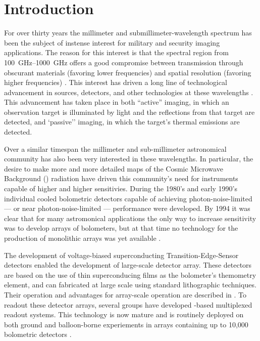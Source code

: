 \chapter{Introduction} \label{c:intro}



For over thirty years the millimeter and submillimeter-wavelength spectrum has been the subject of instense interest for military and security imaging applications.
The reason for this interest is that the spectral region from \SIrange{100}{1000}{\GHz} offers a good compromise between transmission through obscurant materials (favoring lower frequencies) and spatial resolution (favoring higher frequencies) \cite{kruse_why_1981}.
This interest has driven a long line of technological advancement in sources, detectors, and other technologies at these wavelengths \cite{popovic_thz_2011}.
This advancement has taken place in both ``active'' imaging, in which an observation target is illuminated by light and the reflections from that target are detected, and `passive'' imaging, in which the target's thermal emissions are detected.

Over a similar timespan the millimeter and sub-millimeter astronomical community has also been very interested in these wavelengths.
In particular, the desire to make more and more detailed maps of the Cosmic Microwave Background (\CMB) radiation have driven this community's need for instruments capable of higher and higher sensitivies.
During the 1980's and early 1990's individual cooled bolometric detectors capable of achieving photon-noise-limited --- or near photon-noise-limited --- performance were developed.
By 1994 it was clear that for many astromonical applications the only way to increase sensitivity was to develop arrays of bolometers, but at that time no technology for the production of monolithic arrays was yet available \cite{richards_bolometers_1994}.

The development of voltage-biased superconducting Transition-Edge-Sensor detectors enabled the development of large-scale detector array.
These detectors are based on the use of thin superconducing films as the bolometer's themometry element, and can fabricated at large scale using standard lithographic techniques.
Their operation and advantages for array-scale operation are described in .
To readout these detector arrays, several groups have developed \SQUID-based multiplexed readout systems.
This technology is now mature and is routinely deployed on both ground and balloon-borne experiements in arrays containing up to 10,000 bolometric detectors \cite{holland_scuba-2:_2013}.

